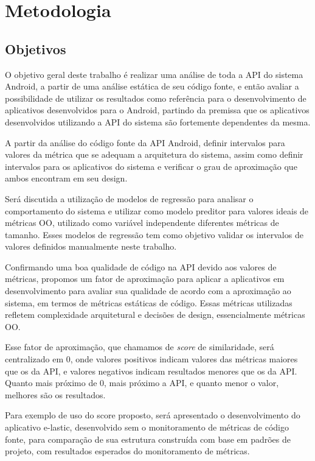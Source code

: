 \chapter{Metodologia}
\label{cap:metodologia}

\section{Objetivos}
O objetivo geral deste trabalho é realizar uma análise de toda a API do sistema Android, a partir de uma análise estática de seu código fonte, e então avaliar a possibilidade de utilizar os resultados como referência para o desenvolvimento de aplicativos desenvolvidos para o Android, partindo da premissa que os aplicativos desenvolvidos utilizando a API do sistema são fortemente dependentes da mesma.

A partir da análise do código fonte da API Android, definir intervalos para valores da métrica que se adequam a arquitetura do sistema, assim como definir intervalos para os aplicativos do sistema e verificar o grau de aproximação que ambos encontram em seu design. 

Será discutida a utilização de modelos de regressão para analisar o comportamento do sistema e utilizar como modelo preditor para valores ideais de métricas OO, utilizado como variável independente diferentes métricas de tamanho. Esses modelos de regressão tem como objetivo validar os intervalos de valores definidos manualmente neste trabalho.

Confirmando uma boa qualidade de código na API devido aos valores de métricas, propomos um fator de aproximação para aplicar a aplicativos em desenvolvimento para avaliar sua qualidade de acordo com a aproximação ao sistema, em termos de métricas estáticas de código. Essas métricas utilizadas refletem complexidade arquitetural e decisões de design, essencialmente métricas OO.

Esse fator de aproximação, que chamamos de \textit{score} de similaridade, será centralizado em 0, onde valores positivos indicam valores das métricas maiores que os da API, e valores negativos indicam resultados menores que os da API. Quanto mais próximo de 0, mais próximo a API, e quanto menor o valor, melhores são os resultados. 

Para exemplo de uso do score proposto, será apresentado o desenvolvimento do aplicativo e-lastic, desenvolvido sem o monitoramento de métricas de código fonte, para comparação de sua estrutura construída com base em padrões de projeto, com resultados esperados do monitoramento de métricas.

